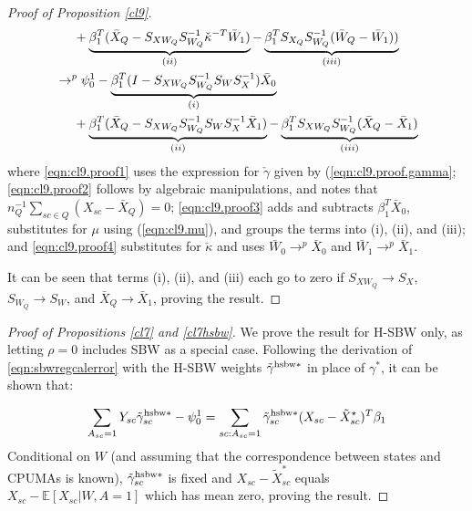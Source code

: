 \documentclass[aoas]{imsart}
\theoremstyle{plain}
\theoremstyle{remark}
\begin{document}
\begin{appendix}
\begin{proof}[Proof of Proposition \ref{cl9}]
\begin{align}
    \nonumber & \hskip.5cm {} + \underbrace{\beta_1^T (\bar{X}_Q - S_{XW_Q} S_{W_Q}^{-1} \check{\kappa}^{-T}\bar{W}_1)}_{(ii)} - \underbrace{\beta_1^TS_{X_Q}S_{W_Q}^{-1}(\bar{W}_Q - \bar{W}_1))}_{(iii)}\\
\label{eqn:cl9.proof4}    & \to^p \psi_0^1 - \underbrace{\beta_1^T(I - S_{XW_Q}S_{W_Q}^{-1}S_WS_X^{-1})\bar{X}_0}_{(i)} \\
    \nonumber & \hskip.5cm {} + \underbrace{\beta_1^T(\bar{X}_Q - S_{XW_Q}S_{W_Q}^{-1} S_W S_X^{-1} \bar{X}_1)}_{(ii)} - \underbrace{\beta_1^TS_{XW_Q}S_{W_Q}^{-1}(\bar{X}_Q - \bar{X}_1)}_{(iii)}
\end{align}
where \eqref{eqn:cl9.proof1} uses the expression for $\check{\gamma}$ given by (\ref{eqn:cl9.proof.gamma}; \eqref{eqn:cl9.proof2} follows by algebraic manipulations, and notes that $n_Q^{-1}\sum_{sc \in Q} (X_{sc} - \bar{X}_Q) = 0$; \eqref{eqn:cl9.proof3} adds and subtracts $\beta_1^T \bar{X}_0$,  substitutes for $\mu$ using (\ref{eqn:cl9.mu}), and groups the terms into (i), (ii), and (iii); and \eqref{eqn:cl9.proof4} substitutes for $\check{\kappa}$ and uses $\bar{W}_0 \to^p \bar{X}_0$ and $\bar{W}_1 \to^p \bar{X}_1$.

It can be seen that terms (i), (ii), and (iii) each go to zero if $S_{XW_Q} \to S_X$, $S_{W_Q} \to S_W$, and $\bar{X}_Q \to \bar{X}_1$, proving the result. 
\end{proof}

\begin{proof}[Proof of Propositions \ref{cl7} and \ref{cl7hsbw}]
    We prove the result for H-SBW only, as letting $\rho=0$ includes SBW as a special case. Following the derivation of \eqref{eqn:sbwregcalerror} with the H-SBW weights $\tilde{\gamma}^{\textup{hsbw}*}$ in place of $\gamma^*$, it can be shown that: 
    
    \begin{align*}
        \sum_{A_{sc}=1} Y_{sc} \tilde{\gamma}_{sc}^{\textup{hsbw}*} - \psi^1_0 = \sum_{sc: A_{sc} = 1}\tilde{\gamma}^{\textup{hsbw}*}_{sc}(X_{sc} - \tilde{X}_{sc}^\star)^T\beta_1
    \end{align*}
Conditional on $W$ (and assuming that the correspondence between states and CPUMAs is known), $\tilde{\gamma}_{sc}^{\textup{hsbw}*}$ is fixed and $X_{sc} - \tilde{X}_{sc}^*$ equals $X_{sc} - \mathbb{E}[X_{sc}|W, A=1]$ which has mean zero, proving the result.
\end{proof}


\end{appendix}
\end{document}
